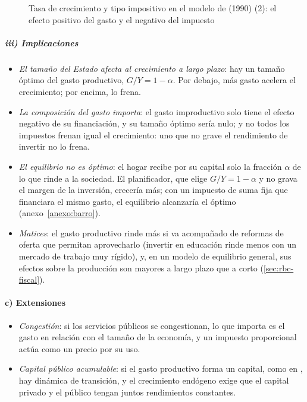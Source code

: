 \documentclass[11pt]{article}
\begin{document}
\begin{figure}[H]
\centering
\caption{Tasa de crecimiento y tipo impositivo en el modelo de  (1990) (2): el efecto positivo del gasto y el negativo del impuesto}\label{fig:barro}
\end{figure}

\subparagraph{iii) Implicaciones}

\begin{itemize}
\item \emph{El tamaño del Estado afecta al crecimiento a largo plazo}: hay un tamaño óptimo del gasto productivo, $G/Y=1-\alpha$. Por debajo, más gasto acelera el crecimiento; por encima, lo frena.
\item \emph{La composición del gasto importa}: el gasto improductivo solo tiene el efecto negativo de su financiación, y su tamaño óptimo sería nulo; y no todos los impuestos frenan igual el crecimiento: uno que no grave el rendimiento de invertir no lo frena.
\item \emph{El equilibrio no es óptimo}: el hogar recibe por su capital solo la fracción $\alpha$ de lo que rinde a la sociedad. El planificador, que elige $G/Y=1-\alpha$ y no grava el margen de la inversión, crecería más; con un impuesto de suma fija que financiara el mismo gasto, el equilibrio alcanzaría el óptimo\nocite{BarroSalaiMartin2004} (anexo~\ref{anexo:barro}).
\item \emph{Matices}: el gasto productivo rinde más si va acompañado de reformas de oferta que permitan aprovecharlo (invertir en educación rinde menos con un mercado de trabajo muy rígido), y, en un modelo de equilibrio general, sus efectos sobre la producción son mayores a largo plazo que a corto (\ref{sec:rbc-fiscal}).
\end{itemize}

\paragraph{c) Extensiones}

\begin{itemize}
\item \emph{Congestión}: si los servicios públicos se congestionan, lo que importa es el gasto en relación con el tamaño de la economía, y un impuesto proporcional actúa como un precio por su uso\nocite{BarroSalaiMartin1992Public}.
\item \emph{Capital público acumulable}: si el gasto productivo forma un capital, como en \textcite{BaxterKing1993Fiscal}, hay dinámica de transición, y el crecimiento endógeno exige que el capital privado y el público tengan juntos rendimientos constantes.
\end{itemize}
\end{document}
